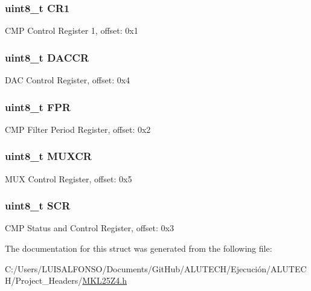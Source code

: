 \subsubsection[{C\+R1}]{\setlength{\rightskip}{0pt plus 5cm}uint8\+\_\+t C\+R1}\label{struct_c_m_p___mem_map_af9a269aaa5da5759c86b43f3cd68e208}
C\+M\+P Control Register 1, offset\+: 0x1 \hypertarget{struct_c_m_p___mem_map_a51dd2d2a0528dfb19a45debc50dc8a51}{}
\subsubsection[{D\+A\+C\+C\+R}]{\setlength{\rightskip}{0pt plus 5cm}uint8\+\_\+t D\+A\+C\+C\+R}\label{struct_c_m_p___mem_map_a51dd2d2a0528dfb19a45debc50dc8a51}
D\+A\+C Control Register, offset\+: 0x4 \hypertarget{struct_c_m_p___mem_map_a190f8642b1bdc9d1252673a28b6b6df6}{}
\subsubsection[{F\+P\+R}]{\setlength{\rightskip}{0pt plus 5cm}uint8\+\_\+t F\+P\+R}\label{struct_c_m_p___mem_map_a190f8642b1bdc9d1252673a28b6b6df6}
C\+M\+P Filter Period Register, offset\+: 0x2 \hypertarget{struct_c_m_p___mem_map_ae5069d9ba4618ae45636fcb5b2061169}{}
\subsubsection[{M\+U\+X\+C\+R}]{\setlength{\rightskip}{0pt plus 5cm}uint8\+\_\+t M\+U\+X\+C\+R}\label{struct_c_m_p___mem_map_ae5069d9ba4618ae45636fcb5b2061169}
M\+U\+X Control Register, offset\+: 0x5 \hypertarget{struct_c_m_p___mem_map_aa43a01363ae5f82700d71abfd78b321d}{}
\subsubsection[{S\+C\+R}]{\setlength{\rightskip}{0pt plus 5cm}uint8\+\_\+t S\+C\+R}\label{struct_c_m_p___mem_map_aa43a01363ae5f82700d71abfd78b321d}
C\+M\+P Status and Control Register, offset\+: 0x3 

The documentation for this struct was generated from the following file\+:\begin{DoxyCompactItemize}
\item 
C\+:/\+Users/\+L\+U\+I\+S\+A\+L\+F\+O\+N\+S\+O/\+Documents/\+Git\+Hub/\+A\+L\+U\+T\+E\+C\+H/\+Ejecución/\+A\+L\+U\+T\+E\+C\+H/\+Project\+\_\+\+Headers/\hyperlink{_m_k_l25_z4_8h}{M\+K\+L25\+Z4.\+h}\end{DoxyCompactItemize}
